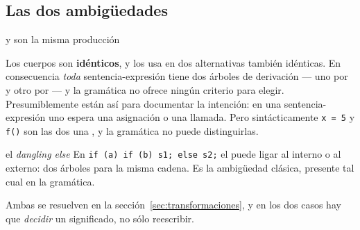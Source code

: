 \subsection{Las dos ambigüedades}

\begin{ambiguedad}{ y  son la misma producción}
\begin{producciones}
\end{producciones}
Los cuerpos son \textbf{idénticos}, y  los usa en dos alternativas también
idénticas. En consecuencia \emph{toda} sentencia-expresión tiene dos árboles de derivación --- uno
por  y otro por  --- y la gramática no ofrece ningún criterio para
elegir. Presumiblemente están así para documentar la intención: en una sentencia-expresión uno
espera una asignación o una llamada. Pero sintácticamente \texttt{x = 5} y \texttt{f()} son las
dos una , y la gramática no puede distinguirlas.
\end{ambiguedad}

\begin{ambiguedad}{el \emph{dangling else}}
En \texttt{if (a) if (b) s1; else s2;} el  puede ligar al  interno o al externo:
dos árboles para la misma cadena. Es la ambigüedad clásica, presente tal cual en la gramática.
\end{ambiguedad}

Ambas se resuelven en la sección~\ref{sec:transformaciones}, y en los dos casos hay que
\emph{decidir} un significado, no sólo reescribir.
